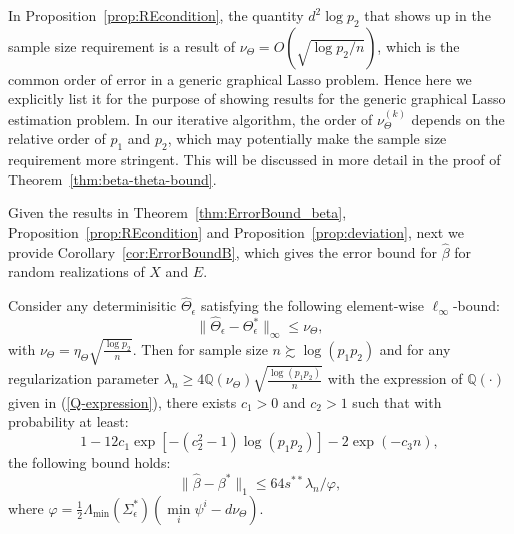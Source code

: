 \begin{remark} 
In Proposition~\ref{prop:REcondition}, the quantity $d^2\log p_2$ that shows up in the sample size requirement is a result of $\nu_\Theta =O(\sqrt{\log p_2/n})$, which is the common order of error in a generic graphical Lasso problem. Hence here we explicitly list it for the purpose of showing results for the generic graphical Lasso estimation problem. In our iterative algorithm, the order of $\nu_\Theta^{(k)}$ depends on the relative order of $p_1$ and $p_2$, which may potentially make the sample size requirement more stringent. This will be discussed in more detail in the proof of Theorem~\ref{thm:beta-theta-bound}.
\end{remark}

%
%
%
%

\medskip
Given the results in Theorem~\ref{thm:ErrorBound_beta}, Proposition~\ref{prop:REcondition} and Proposition~\ref{prop:deviation}, next we provide Corollary~\ref{cor:ErrorBoundB}, which gives the error bound for $\widehat{\beta}$ for random realizations of $X$ and $E$. 


\begin{corollary} \label{cor:ErrorBoundB}
Consider any determinisitic $\widehat{\Theta}_\epsilon$ satisfying the following element-wise $\ell_\infty$-bound:
\begin{equation*}
\|\widehat{\Theta}_\epsilon-\Theta_\epsilon^*\|_\infty \leq  \nu_\Theta,  \label{Theta-condition}
\end{equation*}
with $\nu_\Theta= \eta_\Theta\sqrt{\frac{\log p_2}{n}}$. Then for sample size $n \succsim \log(p_1p_2)$ and for any regularization parameter $\lambda_n\geq 4\mathbb{Q}(\nu_\Theta)\sqrt{\frac{\log (p_1p_2)}{n}}$ with the expression of $\mathbb{Q}(\cdot)$ given in (\ref{Q-expression}), there exists $c_1>0$ and $c_2>1$ such that with probability at least:
\begin{equation*}
1-12c_1\exp[-(c_2^2-1)\log (p_1p_2)] -  2\exp(-c_3n),
\end{equation*}
the following bound holds:
\begin{equation}\label{bbound-1}
\|\widehat{\beta}-\beta^*\|_1  \leq  64s^{**}\lambda_n/\varphi,
\end{equation}
where $\varphi = \frac{1}{2}\Lambda_{\min}(\Sigma_\epsilon^*)(\min\limits_i\psi^i-d\nu_\Theta)$.
\end{corollary}
